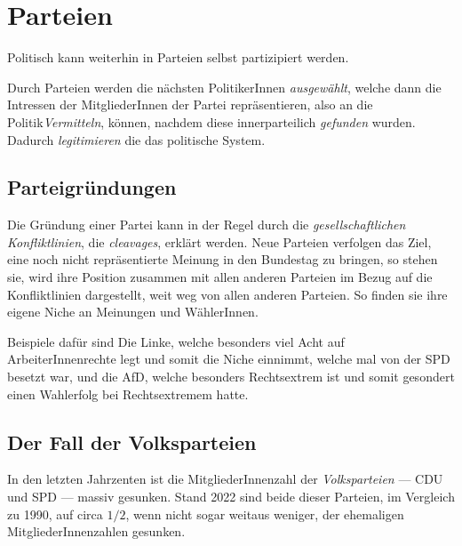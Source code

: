 \documentclass{article}
\begin{document}
\section{Parteien}
Politisch kann weiterhin in Parteien selbst partizipiert werden.
 
Durch Parteien werden die nächsten PolitikerInnen \emph{ausgewählt}, welche dann die Intressen der MitgliederInnen der Partei repräsentieren, also an die Politik\emph{Vermitteln}, können, nachdem diese innerparteilich \emph{gefunden} wurden. Dadurch \emph{legitimieren} die das politische System. 
 
\subsection{Parteigründungen}
Die Gründung einer Partei kann in der Regel durch die \emph{gesellschaftlichen Konfliktlinien}, die \emph{cleavages}, erklärt werden. Neue Parteien verfolgen das Ziel, eine noch nicht repräsentierte Meinung in den Bundestag zu bringen, so stehen sie, wird ihre Position zusammen mit allen anderen Parteien im Bezug auf die Konfliktlinien dargestellt, weit weg von allen anderen Parteien. So finden sie ihre eigene Niche an Meinungen und WählerInnen. 
 

Beispiele dafür sind Die Linke, welche besonders viel Acht auf ArbeiterInnenrechte legt und somit die Niche einnimmt, welche mal von der SPD besetzt war, und die AfD, welche besonders Rechtsextrem ist und somit gesondert einen Wahlerfolg bei Rechtsextremem hatte.
 
\subsection{Der Fall der Volksparteien}
In den letzten Jahrzenten ist die MitgliederInnenzahl der \emph{Volksparteien} --- CDU und SPD --- massiv gesunken. Stand 2022 sind beide dieser Parteien, im Vergleich zu 1990, auf circa $1/2$, wenn nicht sogar weitaus weniger, der ehemaligen MitgliederInnenzahlen gesunken. 
\end{document}
